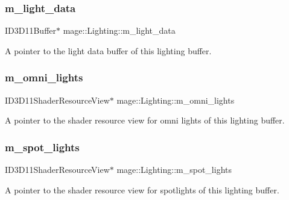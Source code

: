 \subsubsection{\texorpdfstring{m\+\_\+light\+\_\+data}{m\_light\_data}}
{\footnotesize\ttfamily I\+D3\+D11\+Buffer$\ast$ mage\+::\+Lighting\+::m\+\_\+light\+\_\+data}

A pointer to the light data buffer of this lighting buffer. \hypertarget{structmage_1_1_lighting_ad116b6a834a38a114276da0c6fd5544c}{}\label{structmage_1_1_lighting_ad116b6a834a38a114276da0c6fd5544c} 
\subsubsection{\texorpdfstring{m\+\_\+omni\+\_\+lights}{m\_omni\_lights}}
{\footnotesize\ttfamily I\+D3\+D11\+Shader\+Resource\+View$\ast$ mage\+::\+Lighting\+::m\+\_\+omni\+\_\+lights}

A pointer to the shader resource view for omni lights of this lighting buffer. \hypertarget{structmage_1_1_lighting_a6bb1975014038fd8205f25c48e8ed1e3}{}\label{structmage_1_1_lighting_a6bb1975014038fd8205f25c48e8ed1e3} 
\subsubsection{\texorpdfstring{m\+\_\+spot\+\_\+lights}{m\_spot\_lights}}
{\footnotesize\ttfamily I\+D3\+D11\+Shader\+Resource\+View$\ast$ mage\+::\+Lighting\+::m\+\_\+spot\+\_\+lights}

A pointer to the shader resource view for spotlights of this lighting buffer. 